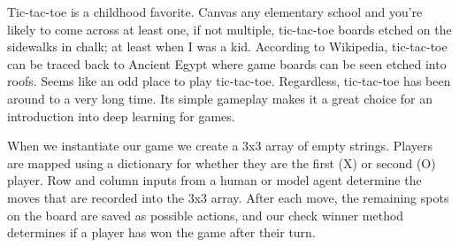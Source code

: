 

Tic-tac-toe is a childhood favorite.
Canvas any elementary school and you're likely to come across at least one, if not
multiple, tic-tac-toe boards etched on the sidewalks in chalk;
at least when I was a kid.
According to Wikipedia, tic-tac-toe can be traced back to Ancient Egypt where game boards can be seen etched into roofs.
Seems like an odd place to play tic-tac-toe.
Regardless, tic-tac-toe has been around to a very long time.
Its simple gameplay makes it a great choice for an introduction into deep learning for games.

When we instantiate our game we create a 3x3 array of empty strings.
Players are mapped using a dictionary for whether they are the first (X) or second (O) player.
Row and column inputs from a human or model agent determine the moves that are recorded into the 3x3 array.
After each move, the remaining spots on the board are saved as possible actions, and our check winner method determines if a player has won the game after their turn.
